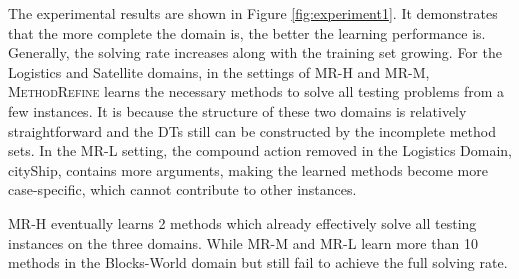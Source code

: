 \documentclass[letterpaper]{article} %
\begin{document}
The experimental results are shown in Figure \ref{fig:experiment1}.
It demonstrates that the more complete the domain is, the better the learning performance is.
Generally, the solving rate increases along with the training set growing. %
For the Logistics and Satellite domains, in the settings of MR-H and MR-M, \textsc{MethodRefine} learns the necessary methods to solve all testing problems from a few instances.
It is because the structure of these two domains is relatively straightforward and the DTs still can be constructed by the incomplete method sets.
In the MR-L setting, the compound action removed in the Logistics Domain, \textsf{cityShip}, contains more arguments, making the learned methods become more case-specific, which cannot contribute to other instances.

MR-H eventually learns 2 methods which already effectively solve all testing instances on the three domains.
While MR-M and MR-L learn more than 10 methods in the Blocks-World domain but still fail to achieve the full solving rate.
\end{document}
